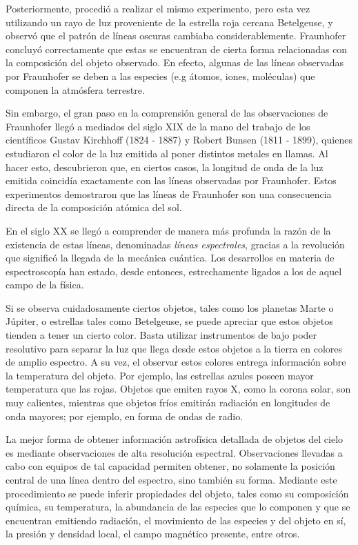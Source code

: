 Posteriormente, procedió a realizar el mismo experimento, pero esta vez utilizando un rayo de luz proveniente de la estrella roja cercana Betelgeuse, y observó que el patrón de líneas oscuras cambiaba considerablemente. Fraunhofer concluyó correctamente que estas se encuentran de cierta forma relacionadas con la composición del objeto observado. En efecto, algunas de las líneas observadas por Fraunhofer se deben a las especies (e.g átomos, iones, moléculas) que componen la atmósfera terrestre.

Sin embargo, el gran paso en la comprensión general de las observaciones de Fraunhofer llegó a mediados del siglo XIX de la mano del trabajo de los científicos Gustav Kirchhoff (1824 - 1887) y Robert Bunsen (1811 - 1899), quienes estudiaron el color de la luz emitida al poner distintos metales en llamas. Al hacer esto, descubrieron que, en ciertos casos, la longitud de onda de la luz emitida coincidía exactamente con las líneas observadas por Fraunhofer. Estos experimentos demostraron que las líneas de Fraunhofer son una consecuencia directa de la composición atómica del sol.

En el siglo XX se llegó a comprender de manera más profunda la razón de la existencia de estas líneas, denominadas \textit{líneas espectrales}, gracias a la revolución que significó la llegada de la mecánica cuántica. Los desarrollos en materia de espectroscopía han estado, desde entonces, estrechamente ligados a los de aquel campo de la física.

Si se observa cuidadosamente ciertos objetos, tales como los planetas Marte o Júpiter, o estrellas tales como Betelgeuse, se puede apreciar que estos objetos tienden a tener un cierto color. Basta utilizar instrumentos de bajo poder resolutivo para separar la luz que llega desde estos objetos a la tierra en colores de amplio espectro. A su vez, el observar estos colores entrega información sobre la temperatura del objeto. Por ejemplo, las estrellas azules poseen mayor temperatura que las rojas. Objetos que emiten rayos X, como la corona solar, son muy calientes, mientras que objetos fríos emitirán radiación en longitudes de onda mayores; por ejemplo, en forma de ondas de radio.

La mejor forma de obtener información astrofísica detallada de objetos del cielo es mediante observaciones de alta resolución espectral. Observaciones llevadas a cabo con equipos de tal capacidad permiten obtener, no solamente la posición central de una línea dentro del espectro, sino también su forma. Mediante este procedimiento se puede inferir propiedades del objeto, tales como su composición química, su temperatura, la abundancia de las especies que lo componen y que se encuentran emitiendo radiación, el movimiento de las especies y del objeto en sí, la presión y densidad local, el campo magnético presente, entre otros.

